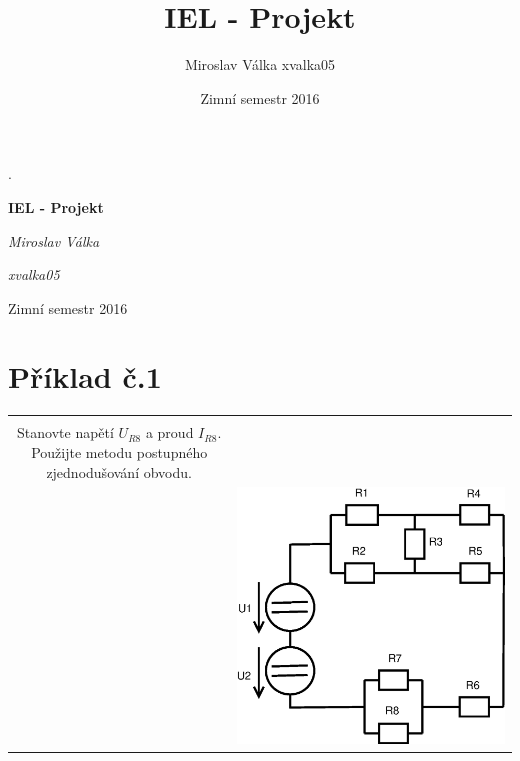 \documentclass[a4paper, 12pt]{article}
\title{IEL - Projekt}
\author{Miroslav Válka xvalka05 }
\date{Zimní semestr 2016}
\begin{document}
\begin{titlepage}
    \centering
    .\\[3cm]
    {\huge\bfseries IEL - Projekt \par}
    \vspace{2cm}
    {\Large\itshape Miroslav Válka \par}
    \vspace{5mm}
    {\Large\itshape xvalka05 \par}
    \vspace{10mm}
    {\Large Zimní semestr 2016 \par}
\end{titlepage}


\newpage

\center
\section{Příklad č.1}

\begin{tabular}{c c}
    \begin{minipage}{8cm}
        .\\[-5cm]
        Stanovte napětí $U_{R8}$ a proud 
        $I_{R8}$. Použijte metodu postupného 
        zjednodušování obvodu.\\
    \end{minipage}
    &
    \includegraphics[scale=0.4]{pr1/Diagram1.eps}
    \\
\end{tabular}
\end{document}
